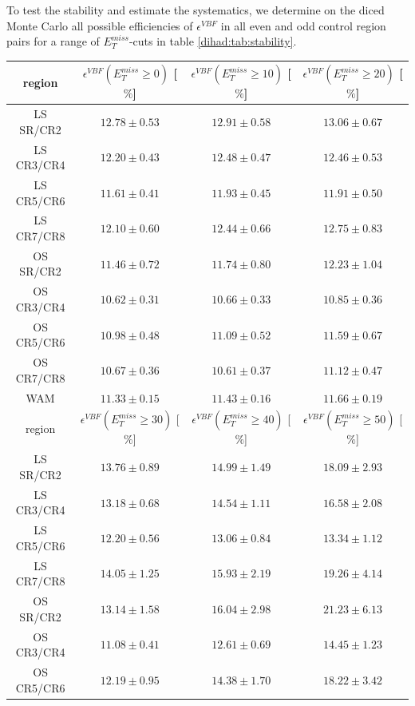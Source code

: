 To test the stability and estimate the systematics, we determine on the diced Monte Carlo all possible efficiencies of $\epsilon^{VBF}$ in all even and odd control region pairs for a range of $E_{T}^{miss}$-cuts in table \ref{dihad:tab:stability}.
\begin{table}[!h]
	\centering
	\begin{tabular}{|c||c|c|c|}
		\hline
		region     & $\epsilon^{VBF}(E_{T}^{miss}\geq0)$ [$\%$]& $\epsilon^{VBF}(E_{T}^{miss}\geq10)$ [$\%$]& $\epsilon^{VBF}(E_{T}^{miss}\geq20)$ [$\%$]\\ \hline \hline
		LS SR/CR2  & $12.78\pm0.53$ & $12.91\pm0.58$ & $13.06\pm0.67$ \\ \hline
		LS CR3/CR4 & $12.20\pm0.43$ & $12.48\pm0.47$ & $12.46\pm0.53$ \\ \hline
		LS CR5/CR6 & $11.61\pm0.41$ & $11.93\pm0.45$ & $11.91\pm0.50$ \\ \hline
		LS CR7/CR8 & $12.10\pm0.60$ & $12.44\pm0.66$ & $12.75\pm0.83$ \\ \hline \hline
		OS SR/CR2  & $11.46\pm0.72$ & $11.74\pm0.80$ & $12.23\pm1.04$ \\ \hline
		OS CR3/CR4 & $10.62\pm0.31$ & $10.66\pm0.33$ & $10.85\pm0.36$ \\ \hline
		OS CR5/CR6 & $10.98\pm0.48$ & $11.09\pm0.52$ & $11.59\pm0.67$ \\ \hline
		OS CR7/CR8 & $10.67\pm0.36$ & $10.61\pm0.37$ & $11.12\pm0.47$ \\ \hline \hline
		WAM        & $11.33\pm0.15$ & $11.43\pm0.16$ & $11.66\pm0.19$ \\ \hline
		\hline
		\hline
		region     & $\epsilon^{VBF}(E_{T}^{miss}\geq30)$ [$\%$]& $\epsilon^{VBF}(E_{T}^{miss}\geq40)$ [$\%$]& $\epsilon^{VBF}(E_{T}^{miss}\geq50)$ [$\%$]\\ \hline \hline
		LS SR/CR2  & $13.76\pm0.89$ & $14.99\pm1.49$ & $18.09\pm2.93$ \\ \hline
		LS CR3/CR4 & $13.18\pm0.68$ & $14.54\pm1.11$ & $16.58\pm2.08$ \\ \hline
		LS CR5/CR6 & $12.20\pm0.56$ & $13.06\pm0.84$ & $13.34\pm1.12$ \\ \hline
		LS CR7/CR8 & $14.05\pm1.25$ & $15.93\pm2.19$ & $19.26\pm4.14$ \\ \hline \hline
		OS SR/CR2  & $13.14\pm1.58$ & $16.04\pm2.98$ & $21.23\pm6.13$ \\ \hline
		OS CR3/CR4 & $11.08\pm0.41$ & $12.61\pm0.69$ & $14.45\pm1.23$ \\ \hline
		OS CR5/CR6 & $12.19\pm0.95$ & $14.38\pm1.70$ & $18.22\pm3.42$ \\ \hline

\end{tabular}
\end{table}
